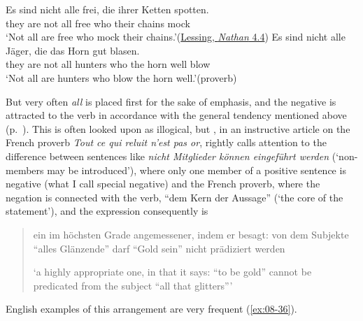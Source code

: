 \ea \label{ex:08-34}
\ea
\gll Es sind nicht alle frei, die ihrer Ketten spotten.\\
 they are not all free who their chains mock\\
\glt `Not all are free who mock their chains.'\hfill(\href{https://archive.org/details/nathanderweise02lessgoog/page/n216/mode/2up?q=%22Es+sind+nicht+alle+frei%22&view=theater}{Lessing, \textit{Nathan} 4.4}) %
\ex 
\gll Es sind nicht alle Jäger, die das Horn gut blasen.\\
 they are not all hunters who the horn well blow\\
\glt `Not all are hunters who blow the horn well.'\hfill(proverb) %
\z
\z

But very often \textit{all} is placed first for the sake of emphasis, and the negative is attracted to the verb in accordance with the general tendency mentioned above (p.~\pageref{para:nexal-negation-tendency}). This is often looked upon as illogical, but \citet[\href{https://archive.org/details/vermischtebeitr04toblgoog/page/n191/mode/2up?view=theater}{159ff}]{tobler1886vermischte}, in an instructive article on the French proverb \textit{Tout ce qui reluit n'est pas or}, rightly calls attention to the difference between sentences like \textit{nicht Mitglieder können ein\-ge\-führt werden} (`non-members may be introduced'), where only one member of a positive sentence is negative (what I call special negative) and the French proverb, where the negation is connected with the verb, ``dem Kern der Aussage'' (`the core of the statement'), and the expression consequently is 

\begin{quote}
ein im höchsten Grade angemessener, indem er besagt: von dem Subjekte ``alles Glänzende'' darf ``Gold sein'' nicht prädiziert werden

`a highly appropriate one, in that it says: ``to be gold'' cannot be predicated from the subject ``all that glitters'''
\end{quote}

English examples of this arrangement are very frequent (\ref{ex:08-36}).

